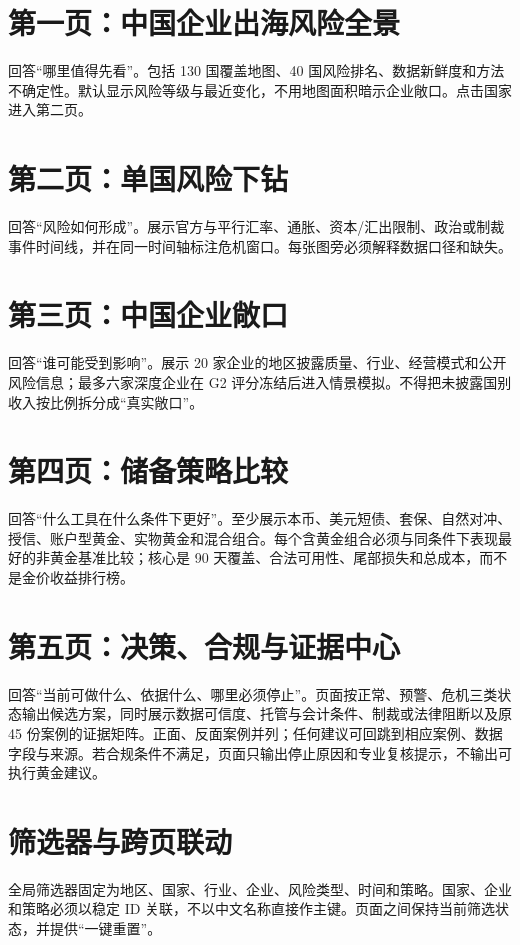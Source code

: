 \documentclass[UTF8,12pt,openany]{ctexbook}
\begin{document}
\section{第一页：中国企业出海风险全景}
回答“哪里值得先看”。包括 130 国覆盖地图、40 国风险排名、数据新鲜度和方法不确定性。默认显示风险等级与最近变化，不用地图面积暗示企业敞口。点击国家进入第二页。

\section{第二页：单国风险下钻}
回答“风险如何形成”。展示官方与平行汇率、通胀、资本/汇出限制、政治或制裁事件时间线，并在同一时间轴标注危机窗口。每张图旁必须解释数据口径和缺失。

\section{第三页：中国企业敞口}
回答“谁可能受到影响”。展示 20 家企业的地区披露质量、行业、经营模式和公开风险信息；最多六家深度企业在 G2 评分冻结后进入情景模拟。不得把未披露国别收入按比例拆分成“真实敞口”。

\section{第四页：储备策略比较}
回答“什么工具在什么条件下更好”。至少展示本币、美元短债、套保、自然对冲、授信、账户型黄金、实物黄金和混合组合。每个含黄金组合必须与同条件下表现最好的非黄金基准比较；核心是 90 天覆盖、合法可用性、尾部损失和总成本，而不是金价收益排行榜。

\section{第五页：决策、合规与证据中心}
回答“当前可做什么、依据什么、哪里必须停止”。页面按正常、预警、危机三类状态输出候选方案，同时展示数据可信度、托管与会计条件、制裁或法律阻断以及原 45 份案例的证据矩阵。正面、反面案例并列；任何建议可回跳到相应案例、数据字段与来源。若合规条件不满足，页面只输出停止原因和专业复核提示，不输出可执行黄金建议。

\section{筛选器与跨页联动}
全局筛选器固定为地区、国家、行业、企业、风险类型、时间和策略。国家、企业和策略必须以稳定 ID 关联，不以中文名称直接作主键。页面之间保持当前筛选状态，并提供“一键重置”。
\end{document}
